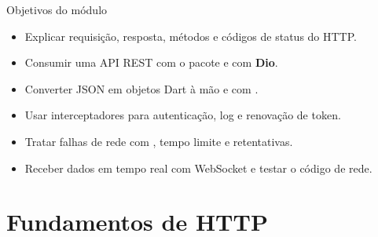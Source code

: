\documentclass[aspectratio=169,10pt]{beamer}
\begin{document}
\capa

\begin{frame}{Objetivos do módulo}
  \begin{conceito}
    \begin{itemize}
      \item Explicar requisição, resposta, métodos e códigos de status do HTTP.
      \item Consumir uma API REST com o pacote  e com \textbf{Dio}.
      \item Converter JSON em objetos Dart à mão e com .
      \item Usar interceptadores para autenticação, log e renovação de token.
      \item Tratar falhas de rede com , tempo limite e retentativas.
      \item Receber dados em tempo real com WebSocket e testar o código de rede.
    \end{itemize}
  \end{conceito}
\end{frame}

\sumario



\section{Fundamentos de HTTP}
\end{document}
